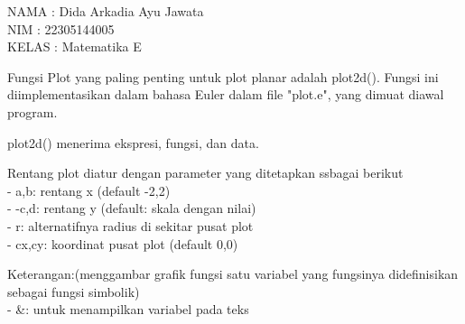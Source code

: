 \documentclass[a4paper,10pt]{article}
\begin{document}
\begin{eulernotebook}
\begin{eulercomment}
NAMA : Dida Arkadia Ayu Jawata\\
NIM : 22305144005\\
KELAS  : Matematika E
\end{eulercomment}
\begin{eulercomment}

\begin{eulercomment}
\begin{eulercomment}
Fungsi Plot yang paling penting untuk plot planar adalah plot2d().
Fungsi ini diimplementasikan dalam bahasa Euler dalam file "plot.e",
yang dimuat diawal program.

plot2d() menerima ekspresi, fungsi, dan data.

Rentang plot diatur dengan parameter yang ditetapkan ssbagai berikut\\
- a,b: rentang x (default -2,2)\\
- -c,d: rentang y (default: skala dengan nilai)\\
- r: alternatifnya radius di sekitar pusat plot\\
- cx,cy: koordinat pusat plot (default 0,0)

Keterangan:(menggambar grafik fungsi satu variabel yang fungsinya
didefinisikan sebagai fungsi simbolik)\\
- \&: untuk menampilkan variabel pada teks


\end{eulercomment}
\end{eulercomment}
\end{eulercomment}
\end{eulernotebook}
\end{document}
